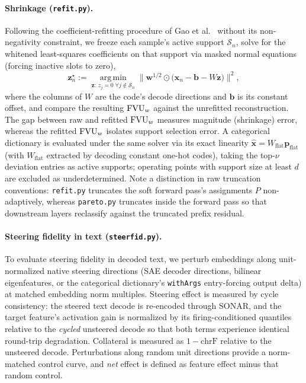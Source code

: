 \paragraph{Shrinkage (\texttt{refit.py}).}
Following the coefficient-refitting procedure of Gao et al.~\cite{gao2024}
without its non-negativity constraint, we freeze each sample's active
support $\mathcal{S}_n$, solve for the whitened least-squares coefficients
on that support via masked normal equations (forcing inactive slots to
zero),
\begin{equation}
	\mathbf{z}^{\star}_n := \operatorname*{arg\,min}_{\mathbf{z} :\, z_j = 0 \;\forall j \notin \mathcal{S}_n}
	\big\lVert \mathbf{w}^{1/2} \odot \big(\mathbf{x}_n - \mathbf{b} - W \mathbf{z}\big)\big\rVert^2,
	\label{eq:refit}
\end{equation}
where the columns of $W$ are the code's decode directions and $\mathbf{b}$
is its constant offset, and compare the resulting $\mathrm{FVU}_w$ against the
unrefitted reconstruction. The gap between raw and refitted $\mathrm{FVU}_w$ measures
magnitude (shrinkage) error, whereas the refitted $\mathrm{FVU}_w$ isolates support
selection error. A categorical dictionary is evaluated under the same
solver via its exact linearity $\hat{\mathbf{x}} = W_{\mathrm{flat}}
\mathbf{p}_{\mathrm{flat}}$ (with $W_{\mathrm{flat}}$ extracted by decoding
constant one-hot codes), taking the top-$\nu$ deviation entries as active
supports; operating points with support size at least $d$ are excluded as
underdetermined. Note a distinction in raw truncation conventions:
\texttt{refit.py} truncates the soft forward pass's assignments $P$
non-adaptively, whereas \texttt{pareto.py} truncates inside the forward
pass so that downstream layers reclassify against the truncated prefix
residual.

\paragraph{Steering fidelity in text (\texttt{steerfid.py}).}
To evaluate steering fidelity in decoded text, we perturb embeddings along
unit-normalized native steering directions (SAE decoder directions, bilinear
eigenfeatures, or the categorical dictionary's \texttt{withArgs}
entry-forcing output delta) at matched embedding norm multiples. Steering
effect is measured by cycle consistency: the steered text decode is
re-encoded through SONAR, and
the target feature's activation gain is normalized by its
firing-conditioned quantiles relative to the \emph{cycled} unsteered decode
so that both terms experience identical round-trip degradation. Collateral
is measured as $1 - \mathrm{chrF}$ relative to the unsteered decode.
Perturbations along random unit directions provide a norm-matched control
curve, and \emph{net} effect is defined as feature effect minus that
random control.

